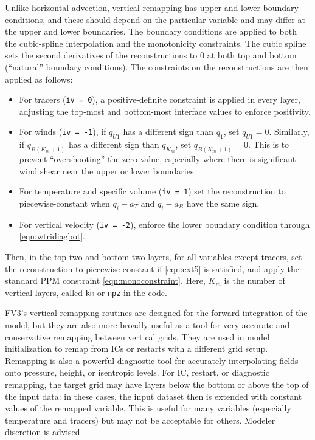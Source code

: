 \documentclass[10pt,letterpaper,margin=1in]{memoir}
\begin{document}
Unlike horizontal advection, vertical remapping has upper and lower boundary conditions, and these should depend on the particular variable and may differ at the upper and lower boundaries. The boundary conditions are applied to both the cubic-spline interpolation and the monotonicity constraints. The cubic spline sets the second derivatives of the reconstructions to 0 at both top and bottom (``natural'' boundary conditions). The constraints on the reconstructions are then applied as follows:
\begin{itemize}
\item For tracers (\texttt{iv = 0}), a positive-definite constraint is applied in every layer, adjusting the top-most and bottom-most interface values to enforce positivity. 
\item For winds (\texttt{iv = -1}), if $q_{U1}$ has a different sign than $q_1$, set $q_{U1} = 0$. Similarly, if $q_{B(K_m+1)}$ has a different sign than $q_{K_m}$, set $q_{B(K_m+1)} = 0.$ This is to prevent ``overshooting'' the zero value, especially where there is significant wind shear near the upper or lower boundaries.
\item For temperature and specific volume (\texttt{iv = 1}) set the reconstruction to piecewise-constant when $q_i - a_T$ and $q_i - a_B$ have the same sign. 
\item For vertical velocity (\texttt{iv = -2}), enforce the lower boundary condition through \eqref{eqn:wtridiagbot}.
\end{itemize}
Then, in the top two and bottom two layers, for all variables except tracers, set the reconstruction to piecewise-constant if \eqref{eqn:ext5} is satisfied, and apply the standard PPM constraint \eqref{eqn:monoconstraint}.
Here, $K_m$ is the number of vertical layers, called \texttt{km} or \texttt{npz} in the code.

FV3's vertical remapping routines are designed for the forward integration of the model, but they are also more broadly useful as a tool for very accurate and conservative remapping between vertical grids. They are used in model initialization to remap from ICs or restarts with a different grid setup. Remapping is also a powerful diagnostic tool for accurately interpolating fields onto pressure, height, or isentropic levels. For IC, restart, or diagnostic remapping, the target grid may have layers below the bottom or above the top of the input data: in these cases, the input dataset then is extended with constant values of the remapped variable. This is useful for many variables (especially temperature and tracers) but may not be acceptable for others. Modeler discretion is advised.
\end{document}
